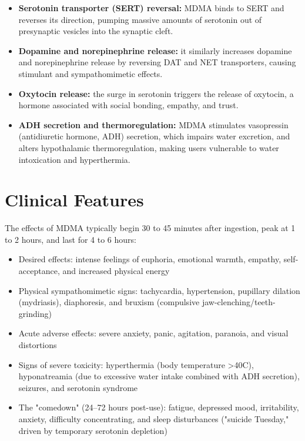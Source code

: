 \begin{itemize}
    \item \textbf{Serotonin transporter (SERT) reversal:} MDMA binds to SERT and reverses its direction, pumping massive amounts of serotonin out of presynaptic vesicles into the synaptic cleft.
    \item \textbf{Dopamine and norepinephrine release:} it similarly increases dopamine and norepinephrine release by reversing DAT and NET transporters, causing stimulant and sympathomimetic effects.
    \item \textbf{Oxytocin release:} the surge in serotonin triggers the release of oxytocin, a hormone associated with social bonding, empathy, and trust.
    \item \textbf{ADH secretion and thermoregulation:} MDMA stimulates vasopressin (antidiuretic hormone, ADH) secretion, which impairs water excretion, and alters hypothalamic thermoregulation, making users vulnerable to water intoxication and hyperthermia.
\end{itemize}

\section*{Clinical Features}
The effects of MDMA typically begin 30 to 45 minutes after ingestion, peak at 1 to 2 hours, and last for 4 to 6 hours:

\begin{itemize}
    \item Desired effects: intense feelings of euphoria, emotional warmth, empathy, self-acceptance, and increased physical energy
    \item Physical sympathomimetic signs: tachycardia, hypertension, pupillary dilation (mydriasis), diaphoresis, and bruxism (compulsive jaw-clenching/teeth-grinding)
    \item Acute adverse effects: severe anxiety, panic, agitation, paranoia, and visual distortions
    \item Signs of severe toxicity: hyperthermia (body temperature \textgreater{}40\textdegree{}C), hyponatreamia (due to excessive water intake combined with ADH secretion), seizures, and serotonin syndrome
    \item The "comedown" (24--72 hours post-use): fatigue, depressed mood, irritability, anxiety, difficulty concentrating, and sleep disturbances ("suicide Tuesday," driven by temporary serotonin depletion)
\end{itemize}

